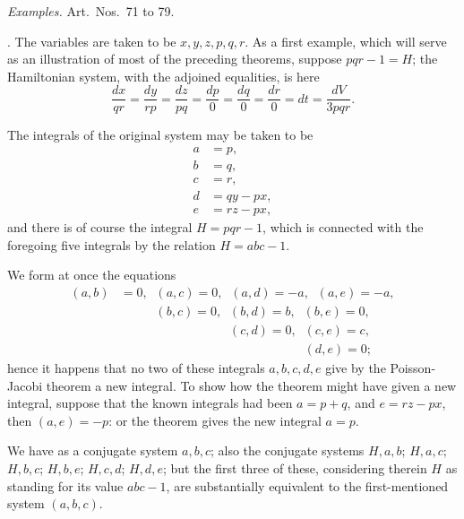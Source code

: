 \documentclass[11pt,a4paper]{article}
\begin{document}
\bigskip

\begin{center}
\emph{Examples.} Art.\ Nos.\ 71 to 79.
\end{center}

\medskip

. The variables are taken to be $x, y, z, p, q, r$. As a first example, which will serve as an illustration of most of the preceding theorems, suppose $pqr - 1 = H$; the Hamiltonian system, with the adjoined equalities, is here
\[
\frac{dx}{qr} = \frac{dy}{rp} = \frac{dz}{pq} = \frac{dp}{0} = \frac{dq}{0} = \frac{dr}{0} = dt = \frac{dV}{3pqr}.
\]

The integrals of the original system may be taken to be
\[
\begin{aligned}
a &= p, \\
b &= q, \\
c &= r, \\
d &= qy - px, \\
e &= rz - px,
\end{aligned}
\]
and there is of course the integral $H = pqr - 1$, which is connected with the foregoing five integrals by the relation $H = abc - 1$.

We form at once the equations
\[
\begin{aligned}
(a, b) &= 0, \;\; (a, c) = 0, \;\; (a, d) = -a, \;\; (a, e) = -a, \\
& \phantom{= 0,} \;\; (b, c) = 0, \;\; (b, d) = b, \;\; (b, e) = 0, \\
& \phantom{= 0, \;\; (b, c) = 0,} \;\; (c, d) = 0, \;\; (c, e) = c, \\
& \phantom{= 0, \;\; (b, c) = 0, \;\; (c, d) = 0,} \;\; (d, e) = 0;
\end{aligned}
\]
hence it happens that no two of these integrals $a, b, c, d, e$ give by the Poisson-Jacobi theorem a new integral. To show how the theorem might have given a new integral, suppose that the known integrals had been $a = p + q$, and $e = rz - px$, then $(a, e) = -p$: or the theorem gives the new integral $a = p$.

\newpage


We have as a conjugate system $a, b, c$; also the conjugate systems $H, a, b$; $H, a, c$; $H, b, c$; $H, b, e$; $H, c, d$; $H, d, e$; but the first three of these, considering therein $H$ as standing for its value $abc - 1$, are substantially equivalent to the first-mentioned system $(a, b, c)$.
\end{document}

